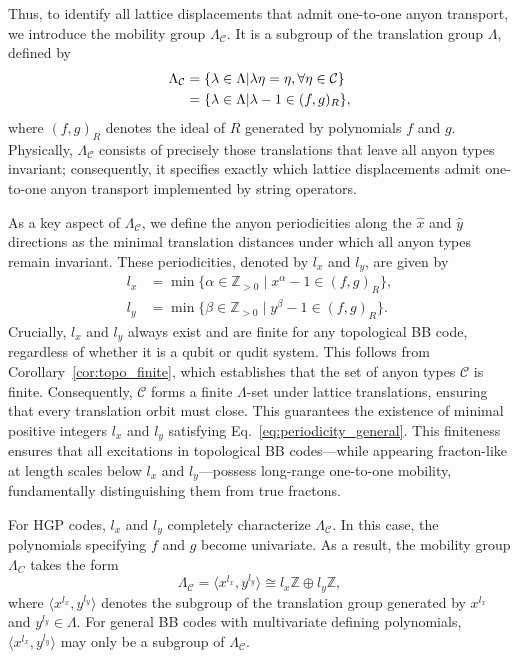 \documentclass[aps,prb,english,superscriptaddress,twocolumn,tightenlines,showpacs,longbibliography,floatfix,amsfonts]{revtex4-2}
\begin{document}
Thus, to identify all lattice displacements that admit one-to-one anyon transport, we introduce the mobility group $\Lambda_{\mathcal{C}}$. It is a subgroup of the translation group $\Lambda$, defined by
\begin{align}
    \Lambda_{\mathcal{C}}&=\{\lambda\in\Lambda|\lambda \eta=\eta,\forall \eta\in\mathcal{C}\}\notag\\
    &=\{\lambda\in\Lambda|\lambda-1\in(f,g)_R\},\label{eq:mobility_group}
\end{align}
where $(f,g)_R$ denotes the ideal of $R$ generated by polynomials $f$ and $g$.
Physically, $\Lambda_{\mathcal{C}}$ consists of precisely those translations that leave all anyon types invariant; consequently, it specifies exactly which lattice displacements admit one-to-one anyon transport implemented by string operators.
  
As a key aspect of $\Lambda_\mathcal{C}$, we define the anyon periodicities along the $\hat{x}$ and $\hat{y}$ directions as the minimal translation distances under which all anyon types remain invariant. These periodicities, denoted by $l_x$ and $l_y$, are given by
\begin{equation}
\begin{aligned}
l_x &=\min\{\alpha\in\mathbb{Z}_{>0} \mid x^{\alpha}-1\in (f,g)_R\},\\
l_y &=\min\{\beta\in\mathbb{Z}_{>0} \mid y^{\beta}-1\in (f,g)_R\}.
\end{aligned}
\label{eq:periodicity_general}
\end{equation}
Crucially, $l_x$ and $l_y$ always exist and are finite for any topological BB code, regardless of whether it is a qubit or qudit system. This follows from Corollary~\ref{cor:topo_finite}, which establishes that the set of anyon types $\mathcal{C}$ is finite. Consequently, $\mathcal{C}$ forms a finite $\Lambda$-set under lattice translations, ensuring that every translation orbit must close. This guarantees the existence of minimal positive integers $l_x$ and $l_y$ satisfying Eq.~\eqref{eq:periodicity_general}. This finiteness ensures that all excitations in topological BB codes---while appearing fracton-like at length scales below $l_x$ and $l_y$---possess long-range one-to-one mobility, fundamentally distinguishing them from true fractons.

For HGP codes, $l_x$ and $l_y$ completely characterize $\Lambda_{\mathcal{C}}$. In this case, the polynomials specifying $f$ and $g$ become univariate. As a result, the mobility group $\Lambda_C$ takes the form
\begin{equation}
    \Lambda_{\mathcal{C}}=\langle x^{l_x},y^{l_y}\rangle\cong l_x\mathbb{Z}\oplus l_y\mathbb{Z},\label{eq:mobility group with univariate polynomials}
\end{equation}
where $\langle x^{l_x},y^{l_y}\rangle$ denotes the subgroup of the translation group generated by $x^{l_x}$ and $y^{l_y}\in\Lambda$. For general BB codes with multivariate defining polynomials, $\langle x^{l_x},y^{l_y}\rangle$ may only be a subgroup of $\Lambda_{\mathcal{C}}$.
\end{document}
